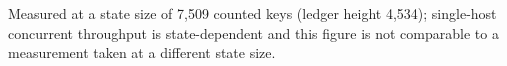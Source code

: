 Measured at a state size of 7,509 counted keys (ledger height 4,534); single-host concurrent throughput is state-dependent and this figure is not comparable to a measurement taken at a different state size.
